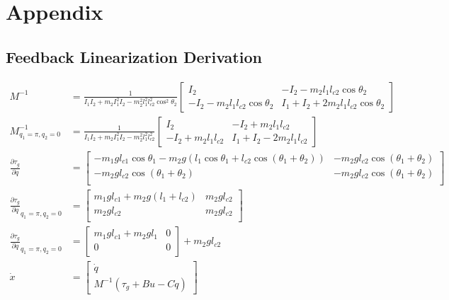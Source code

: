 \documentclass[conference]{IEEEtran}
\begin{document}
\nocite{*}



\onecolumn
\section*{Appendix}
\subsection*{Feedback Linearization Derivation}
\begin{align}
	M^{-1} &= \frac1{I_1I_2+m_2I_1^2I_2-m_2^2l_1^2l_{c2}^2\cos^2\theta_2} \begin{bmatrix}
		I_2 & -I_2-m_2l_1l_{c2}\cos\theta_2 \\
		-I_2-m_2l_1l_{c2}\cos\theta_2 & I_1+I_2+2m_2l_1l_{c2}\cos\theta_2
	\end{bmatrix} \\
	M^{-1}_{q_1=\pi,q_2=0} &= \frac1{I_1I_2+m_2I_1^2I_2-m_2^2l_1^2l_{c2}^2} \begin{bmatrix}
		I_2 & -I_2+m_2l_1l_{c2} \\
		-I_2+m_2l_1l_{c2} & I_1+I_2-2m_2l_1l_{c2}
	\end{bmatrix} \\
	\frac{\partial\tau_g}{\partial q} &= \begin{bmatrix}
		-m_1gl_{c1}\cos\theta_1 - m_2g(l_1\cos\theta_1+l_{c2}\cos(\theta_1+\theta_2)) & -m_2gl_{c2}\cos(\theta_1+\theta_2) \\
		-m_2gl_{c2}\cos(\theta_1+\theta_2) & -m_2gl_{c2}\cos(\theta_1+\theta_2) \\
	\end{bmatrix} \\
	\frac{\partial\tau_g}{\partial q}_{q_1=\pi,q_2=0} &= \begin{bmatrix}
		m_1gl_{c1} + m_2g(l_1+l_{c2}) & m_2gl_{c2} \\
		m_2gl_{c2} & m_2gl_{c2} \\
	\end{bmatrix} \\
	\frac{\partial\tau_g}{\partial q}_{q_1=\pi,q_2=0} &= \begin{bmatrix}
		m_1gl_{c1} + m_2gl_1 & 0 \\
		0 & 0 \\
	\end{bmatrix} + m_2gl_{c2} \\
	\dot x &= \begin{bmatrix}
		\dot q \\
		M^{-1}(\tau_g+Bu-C\dot q)
	\end{bmatrix} \\

\end{align}
\end{document}

